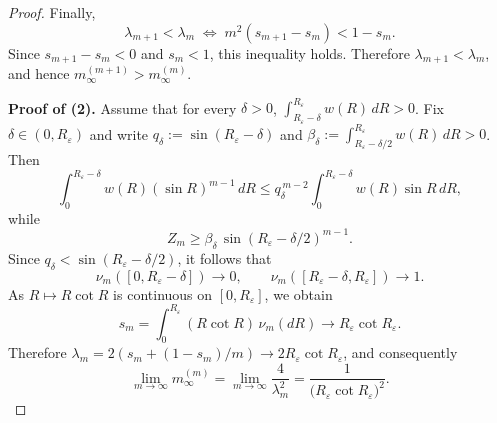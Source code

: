 \documentclass[10pt,a4paper]{amsart}
\begin{document}
\begin{proof}
Finally,
\[
\lambda_{m+1}<\lambda_m
\;\Longleftrightarrow\;
m^2(s_{m+1}-s_m)<1-s_m.
\]
Since \(s_{m+1}-s_m<0\) and \(s_m<1\), this inequality holds.  Therefore \(\lambda_{m+1}<\lambda_m\), and hence \(m_\infty^{(m+1)}>m_\infty^{(m)}\).

\textbf{Proof of (2).}
Assume that for every \(\delta>0\), \(\int_{R_\varepsilon-\delta}^{R_\varepsilon}w(R)\,dR>0\).  Fix \(\delta\in(0,R_\varepsilon)\) and write \(q_\delta:=\sin(R_\varepsilon-\delta)\) and \(\beta_\delta:=\int_{R_\varepsilon-\delta/2}^{R_\varepsilon}w(R)\,dR>0\).  Then
\[
\int_0^{R_\varepsilon-\delta}w(R)(\sin R)^{m-1}\,dR
\le
q_\delta^{\,m-2}\int_0^{R_\varepsilon-\delta}w(R)\sin R\,dR,
\]
while
\[
Z_m\ge \beta_\delta\,\sin(R_\varepsilon-\delta/2)^{m-1}.
\]
Since \(q_\delta<\sin(R_\varepsilon-\delta/2)\), it follows that
\[
\nu_m([0,R_\varepsilon-\delta])\to0,
\qquad
\nu_m([R_\varepsilon-\delta,R_\varepsilon])\to1.
\]
As \(R\mapsto R\cot R\) is continuous on \([0,R_\varepsilon]\), we obtain
\[
s_m=\int_0^{R_\varepsilon}(R\cot R)\,\nu_m(dR)
\longrightarrow
R_\varepsilon\cot R_\varepsilon.
\]
Therefore \(\lambda_m=2(s_m+(1-s_m)/m)\to 2R_\varepsilon\cot R_\varepsilon\), and consequently
\[
\lim_{m\to\infty}m_\infty^{(m)}
=
\lim_{m\to\infty}\frac{4}{\lambda_m^2}
=
\frac{1}{\bigl(R_\varepsilon\cot R_\varepsilon\bigr)^2}.
\]
\end{proof}
\end{document}
